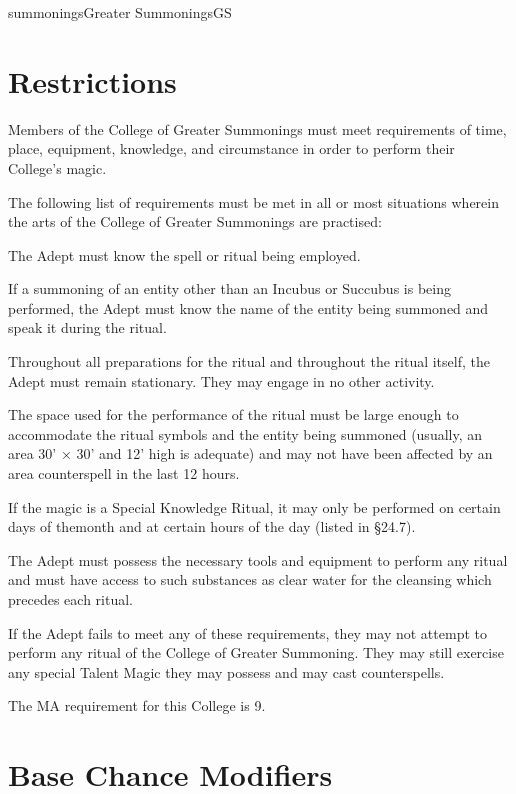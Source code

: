 \begin{College}[1.0]{summonings}{Greater Summonings}{GS}
\section{Restrictions}

Members of the College of Greater Summonings must meet requirements of
time, place, equipment, knowledge, and circumstance in order to
perform their College’s magic.

The following list of requirements must be met in all or most
situations wherein the arts of the College of Greater Summonings are
practised:
\begin{Enumerate}
\item  The Adept must know the spell or ritual being employed.

\item If a summoning of an entity other than an Incubus or Succubus is
being performed, the Adept must know the name of the entity being
summoned and speak it during the ritual.

\item  Throughout all preparations for the ritual and throughout the
ritual itself, the Adept must remain stationary. They may engage in no
other activity.

\item The space used for the performance of the ritual must be large
enough to accommodate the ritual symbols and the entity being summoned
(usually, an area 30’ × 30’ and 12’ high is adequate) and may not have
been affected by an area counterspell in the last 12 hours.

\item If the magic is a Special Knowledge Ritual, it may only be
  performed on certain days of themonth and at certain hours of the
  day (listed in §24.7).


\item The Adept must possess the necessary tools and equipment to
  perform any ritual and must have access to such substances as clear
  water for the cleansing which precedes each ritual.
\end{Enumerate}

If the Adept fails to meet any of these requirements, they may not
attempt to perform any ritual of the College of Greater Summoning.
They may still exercise any special Talent Magic they may possess and
may cast counterspells.

The MA requirement for this College is 9. 

\section{Base Chance Modifiers}


\end{College}

